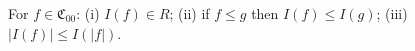 For $f \in \mathfrak{C}_{00}$: (i) $I(f) \in R$; (ii) if $f \leq g$ then $I(f) \leq I(g)$; (iii) $|I(f)| \leq I(|f|)$.
